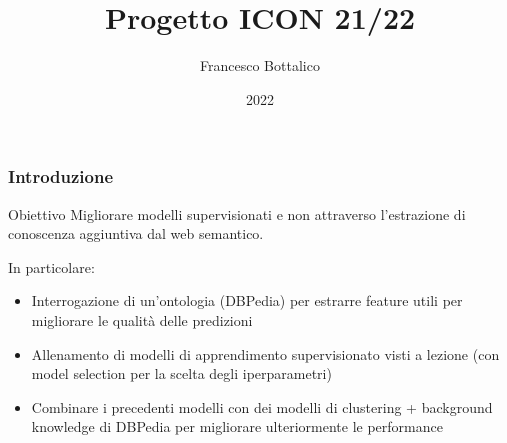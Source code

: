 \documentclass{beamer}
\title{Progetto ICON 21/22}
\author{Francesco Bottalico}
\date{2022}
\begin{document}
\frame{\titlepage}

\begin{frame}
	\frametitle{Introduzione}
	\begin{block}{Obiettivo}
		Migliorare modelli supervisionati e non attraverso l'estrazione di
		conoscenza aggiuntiva dal web semantico.
	\end{block}
	In particolare:
	\begin{itemize}
		\item Interrogazione di un'ontologia (DBPedia) per estrarre feature
			utili per migliorare le qualità delle predizioni
		\item Allenamento di modelli di apprendimento supervisionato visti a
			lezione (con model selection per la scelta degli iperparametri)
		\item Combinare i precedenti modelli con dei modelli di clustering
			+ background knowledge di DBPedia per migliorare ulteriormente le
			performance
	\end{itemize}
\end{frame}
\end{document}
